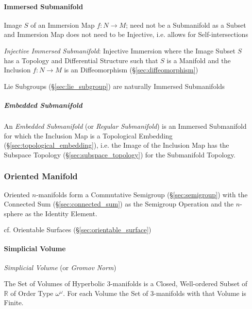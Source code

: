 \paragraph{Immersed Submanifold}\label{sec:immersed_submanifold}\hfill

Image $S$ of an Immersion Map $f : N \rightarrow M$; need not be a Submanifold
as a Subset and Immersion Map does not need to be Injective, i.e. allows for
Self-intersections

\emph{Injective Immersed Submanifold}: Injective Immersion where the Image
Subset $S$ has a Topology and Differential Structure such that $S$ is a
Manifold and the Inclusion $f : N \rightarrow M$ is an Diffeomorphism
(\S\ref{sec:diffeomorphism})

\fist Lie Subgroups (\S\ref{sec:lie_subgroup}) are naturally Immersed
Submanifolds



\subparagraph{Embedded Submanifold}\label{sec:embedded_submanifold}\hfill

An \emph{Embedded Submanifold} (or \emph{Regular Submanifold}) is an Immersed
Submanifold for which the Inclusion Map is a Topological Embedding
(\S\ref{sec:topological_embedding}), i.e. the Image of the Inclusion Map
has the Subspace Topology (\S\ref{sec:subspace_topology}) for the Submanifold
Topology.



\subsubsection{Oriented Manifold}\label{sec:oriented_manifold}

Oriented $n$-manifolds form a Commutative
Semigroup (\S\ref{sec:semigroup}) with the Connected Sum
(\S\ref{sec:connected_sum}) as the Semigroup Operation and the $n$-sphere as
the Identity Element.

cf. Orientable Surfaces (\S\ref{sec:orientable_surface})



\paragraph{Simplicial Volume}\label{sec:simplicial_volume}\hfill

\emph{Simplicial Volume} (or \emph{Gromov Norm})

The Set of Volumes of Hyperbolic 3-manifolds is a Closed, Well-ordered
Subset of $\mathbb{R}$ of Order Type $\omega^\omega$. For each Volume
the Set of 3-manifolds with that Volume is Finite.



